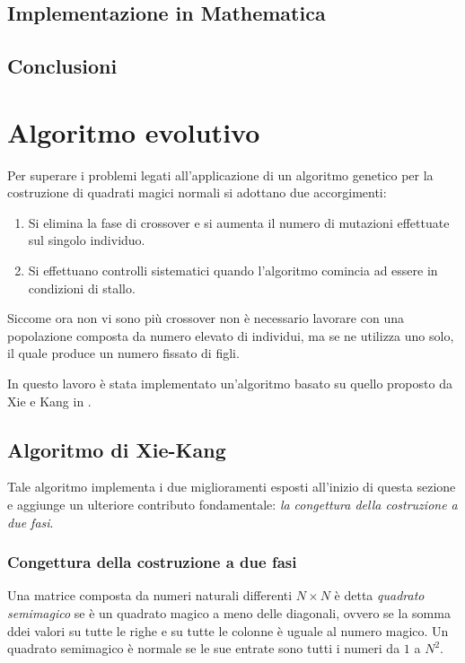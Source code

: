 \documentclass[twoside,twocolumn]{article}
\begin{document}
\subsection{Implementazione in Mathematica}

\subsection{Conclusioni}

\section{Algoritmo evolutivo}
Per superare i problemi legati all'applicazione di un algoritmo genetico per la costruzione di quadrati magici normali si adottano due accorgimenti:
\begin{enumerate}
	\item Si elimina la fase di crossover e si aumenta il numero di mutazioni effettuate sul singolo individuo.
	\item Si effettuano controlli sistematici quando l'algoritmo comincia ad essere in condizioni di stallo. 
\end{enumerate}
Siccome ora non vi sono più crossover non è necessario lavorare con una popolazione composta da numero elevato di individui, ma se ne utilizza uno solo, il quale produce un numero fissato di figli. 

In questo lavoro è stata implementato un'algoritmo basato su quello proposto da  Xie e Kang in \cite{XieKang:2003}.

\subsection{Algoritmo di Xie-Kang}

Tale algoritmo implementa i due miglioramenti esposti all'inizio di questa sezione e aggiunge un ulteriore contributo fondamentale: \emph{la congettura della costruzione a due fasi}.

\subsubsection{Congettura della costruzione a due fasi}
Una matrice composta da numeri naturali differenti $ N\times N $ è detta \emph{quadrato semimagico} se è un quadrato magico a meno delle diagonali, ovvero se la somma ddei valori su tutte le righe e su tutte le colonne è uguale al numero magico. Un quadrato semimagico è normale se le sue entrate sono tutti i numeri da $ 1 $ a $ N^2 $. 
\end{document}
